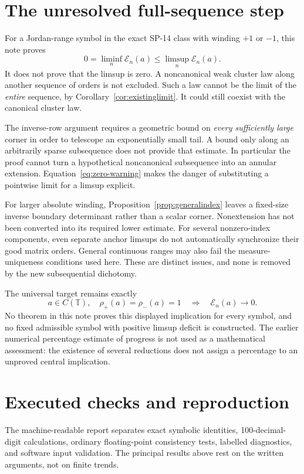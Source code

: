 \documentclass[11pt]{article}
\theoremstyle{definition}
\newcommand{\T}{\mathbb T}
\newcommand{\E}{\mathcal E}
\begin{document}
\section{The unresolved full-sequence step}
For a Jordan-range symbol in the exact SP-14 class with winding $+1$ or $-1$, this note proves
\[
 0=\liminf_n\E_n(a)\le\limsup_n\E_n(a).
\]
It does not prove that the limsup is zero. A noncanonical weak cluster law along another sequence of orders is not excluded. Such a law cannot be the limit of the \emph{entire} sequence, by Corollary~\ref{cor:existinglimit}. It could still coexist with the canonical cluster law.

The inverse-row argument requires a geometric bound on \emph{every sufficiently large} corner in order to telescope an exponentially small tail. A bound only along an arbitrarily sparse subsequence does not provide that estimate. In particular the proof cannot turn a hypothetical noncanonical subsequence into an annular extension. Equation~\eqref{eq:zero-warning} makes the danger of substituting a pointwise limit for a limsup explicit.

For larger absolute winding, Proposition~\ref{prop:generalindex} leaves a fixed-size inverse boundary determinant rather than a scalar corner. Nonextension has not been converted into its required lower estimate. For several nonzero-index components, even separate anchor limsups do not automatically synchronize their good matrix orders. General continuous ranges may also fail the measure-uniqueness conditions used here. These are distinct issues, and none is removed by the new subsequential dichotomy.

The universal target remains exactly
\[
 \boxed{a\in C(\T),\quad \rho_+(a)=\rho_-(a)=1
 \quad\Longrightarrow\quad \E_n(a)\longrightarrow0.}
\]
No theorem in this note proves this displayed implication for every symbol, and no fixed admissible symbol with positive limsup deficit is constructed. The earlier numerical percentage estimate of progress is not used as a mathematical assessment: the existence of several reductions does not assign a percentage to an unproved central implication.

\section{Executed checks and reproduction}\label{sec:checks}

The machine-readable report separates exact symbolic identities, 100-decimal-digit calculations, ordinary floating-point consistency tests, labelled diagnostics, and software input validation. The principal results above rest on the written arguments, not on finite trends.
\end{document}
